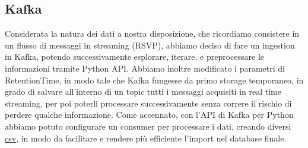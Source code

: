 \documentclass[fleqn,10pt]{SelfArx} %
\begin{document}
{\subsection{Kafka} %
Considerata la natura dei dati a nostra disposizione, che ricordiamo consistere in un flusso di messaggi in streaming (RSVP), abbiamo deciso di fare un ingestion in Kafka, potendo successivamente esplorare, iterare, e preprocessare le informazioni tramite Python API.
Abbiamo inoltre modificato i parametri di RetentionTime, in modo tale che Kafka fungesse da primo storage temporaneo, in grado di salvare all'interno di un topic tutti i messaggi acquisiti in real time streaming, per poi poterli processare successivamente senza correre il rischio di perdere qualche informazione.
Come accennato, con l'API di Kafka per Python abbiamo potuto configurare un consumer per processare i dati, creando diversi \href{https://github.com/DBertazioli/Armeetup/tree/master/csv/struttura}{csv}, %
 in modo da facilitare e rendere più efficiente l'import nel database finale.
}
\end{document}
